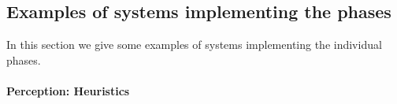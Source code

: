                                          

\subsection{Examples of systems implementing the phases} \label{sec:modelExamples}

In this section we give some examples of systems implementing the
individual phases.

\paragraph{\textbf{\upshape Perception: Heuristics}}

